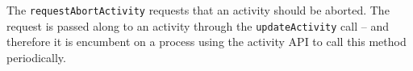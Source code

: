 The \verb+requestAbortActivity+ requests that an activity should be aborted. The request is passed
along to an activity through the \verb+updateActivity+ call -- and therefore
it is encumbent on a process using the activity API to call this method periodically.
